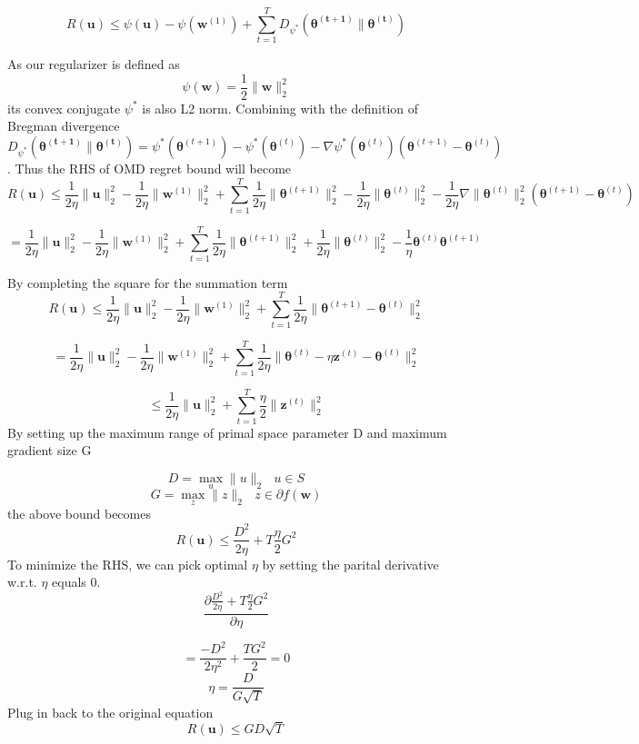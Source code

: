 \documentclass[11pt]{article}
\begin{document}
$$
R(\textbf{u}) \leq \psi (\textbf{u}) - \psi (\textbf{w}^{(1)}) + \sum_{t=1}^T D_{\psi^*} (\mathbf{\theta^{(t+1)}} \| \mathbf{\theta^{(t)}})
$$

As our regularizer is defined as 
$$\psi (\textbf{w}) = \frac{1}{2} \| \textbf{w} \|_2^2$$
its convex conjugate $\psi^*$ is also L2 norm. Combining with the definition of Bregman divergence $D_{\psi^*} (\mathbf{\theta^{(t+1)}} \| \mathbf{\theta^{(t)}}) = \psi^* (\mathbf{\theta}^{(t+1)}) - \psi^* (\mathbf{\theta}^{(t)}) - \nabla \psi^* (\mathbf{\theta}^{(t)})(\mathbf{\theta}^{(t+1)} - \mathbf{\theta}^{(t)})$. Thus the RHS of OMD regret bound will become
$$
R(\textbf{u}) \leq \frac{1}{2\eta} \| \textbf{u} \|_2^2 - \frac{1}{2\eta}\| \textbf{w}^{(1)} \|_2^2 + \sum_{t=1}^T \frac{1}{2\eta}\|\mathbf{\theta}^{(t+1)} \|_2^2 - \frac{1}{2\eta}\|\mathbf{\theta}^{(t)}\|_2^2 - \frac{1}{2\eta}\nabla \|\mathbf{\theta}^{(t)}\|_2^2(\mathbf{\theta}^{(t+1)} - \mathbf{\theta}^{(t)})
$$

$$
= \frac{1}{2\eta} \| \textbf{u} \|_2^2 - \frac{1}{2\eta}\| \textbf{w}^{(1)} \|_2^2 + \sum_{t=1}^T \frac{1}{2\eta}\|\mathbf{\theta}^{(t+1)} \|_2^2 + \frac{1}{2\eta}\|\mathbf{\theta}^{(t)}\|_2^2 - \frac{1}{\eta} \mathbf{\theta}^{(t)}\mathbf{\theta}^{(t+1)}
$$

By completing the square for the summation term
$$
R(\textbf{u}) \leq \frac{1}{2\eta} \| \textbf{u} \|_2^2 - \frac{1}{2\eta}\| \textbf{w}^{(1)} \|_2^2 + \sum_{t=1}^T \frac{1}{2\eta} \|\mathbf{\theta}^{(t+1)} - \mathbf{\theta}^{(t)} \|_2^2
$$

$$
= \frac{1}{2\eta} \| \textbf{u} \|_2^2 - \frac{1}{2\eta}\| \textbf{w}^{(1)} \|_2^2 + \sum_{t=1}^T \frac{1}{2\eta} \|\mathbf{\theta}^{(t)} - \eta \textbf{z}^{(t)} -  \mathbf{\theta}^{(t)} \|_2^2
$$

$$
\leq \frac{1}{2\eta} \| \textbf{u} \|_2^2  + \sum_{t=1}^T \frac{\eta}{2} \|\textbf{z}^{(t)} \|_2^2
$$
By setting up the maximum range of primal space parameter D and maximum gradient size G

$$D = \max_u \| u \|_2 \textbf{   } u \in S$$
$$G = \max_z \| z \|_2 \textbf{   } z \in \partial f(\textbf{w})$$
the above bound becomes
$$R(\textbf{u}) \leq \frac{D^2}{2\eta}   + T\frac{\eta}{2}G^2$$
To minimize the RHS, we can pick optimal $\eta$ by setting the parital derivative w.r.t. $\eta$ equals 0.
$$\frac{\partial \frac{D^2}{2\eta}   + T\frac{\eta}{2}G^2}{\partial \eta}$$

$$= \frac{-D^2}{2\eta^2}   + \frac{TG^2}{2}=0$$
$$\eta = \frac{D}{G\sqrt{T}}$$
Plug in back to the original equation
$$R(\textbf{u}) \leq GD\sqrt{T}$$
\end{document}
